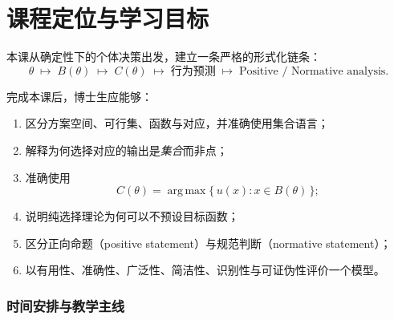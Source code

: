 \newcommand{\R}{\mathbb{R}}
\newcommand{\N}{\mathbb{N}}
\newcommand{\Z}{\mathbb{Z}}
\newcommand{\Q}{\mathbb{Q}}
\newcommand{\argmax}{\operatorname*{arg\,max}}
\newcommand{\argmin}{\operatorname*{arg\,min}}


\thispagestyle{plain}
\vspace{1.2cm}
\vspace{0.35cm}
\vspace{0.9cm}
\vspace{0.5cm}
\vspace{1.6cm}

\section*{课程定位与学习目标}

本课从确定性下的个体决策出发，建立一条严格的形式化链条：
\[
\theta \;\longmapsto\; B(\theta) \;\longmapsto\; C(\theta)
\;\longmapsto\; \text{行为预测} \;\longmapsto\; \text{Positive / Normative analysis}.
\]

完成本课后，博士生应能够：
\begin{enumerate}
  \item 区分方案空间、可行集、函数与对应，并准确使用集合语言；
  \item 解释为何选择对应的输出是\emph{集合}而非点；
  \item 准确使用
        \[
          C(\theta)=\argmax\{\,u(x):x\in B(\theta)\,\};
        \]
  \item 说明纯选择理论为何可以不预设目标函数；
  \item 区分正向命题（positive statement）与规范判断（normative statement）；
  \item 以有用性、准确性、广泛性、简洁性、识别性与可证伪性评价一个模型。
\end{enumerate}



\subsubsection*{时间安排与教学主线}



